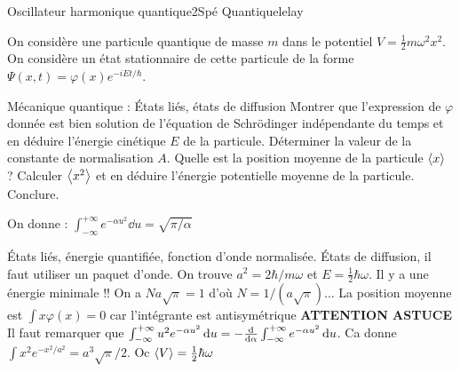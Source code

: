 \begin{exercise}{Oscillateur harmonique quantique}{2}{Spé}
{Quantique}{lelay}

On considère une particule quantique de masse $m$ dans le potentiel $V = \frac12 m \omega^2x^2$. On considère un état stationnaire de cette particule de la forme $\Psi(x,t) = \varphi(x)e^{-i E t/\hbar}$.

\begin{questions}
    \questioncours Mécanique quantique : États liés, états de diffusion
    \question Montrer que l'expression de $\varphi$ donnée est bien solution de l'équation de Schrödinger indépendante du temps et en déduire l'énergie cinétique $E$ de la particule.
    \question Déterminer la valeur de la constante de normalisation $A$.
    \question Quelle est la position moyenne de la particule $\ev{x}$ ? 
    \question Calculer $\ev{x^2}$ et en déduire l'énergie potentielle moyenne de la particule. Conclure.
\end{questions}

On donne : $\int_{-\infty}^{+\infty} e^{-\alpha u^2}\dd{u} = \sqrt{\pi/\alpha}$

\end{exercise}

\begin{solution}

\begin{questions}
    \questioncours États liés, énergie quantifiée, fonction d'onde normalisée. États de diffusion, il faut utiliser un paquet d'onde.
    \question On trouve $a^2 = 2\hbar/m\omega$ et $E = \frac12 \hbar \omega$. Il y a une énergie minimale !!
    \question On a $N a \sqrt{\pi} = 1$ d'où $N = 1/(a\sqrt{\pi})$...
    \question La position moyenne est $\int x \varphi(x) = 0$ car l'intégrante est antisymétrique
    \question \textbf{ATTENTION ASTUCE} Il faut remarquer que $\int_{-\infty}^{+\infty} u^2e^{-\alpha u^2}\dd{u} = -\dv{\alpha} \int_{-\infty}^{+\infty} e^{-\alpha u^2}\dd{u}$. Ca donne $\int x^2e^{-x^2/a^2} = a^3\sqrt{\pi}/2$. Oc $\ev{V} = \frac12 \hbar \omega$
\end{questions}
\end{solution}